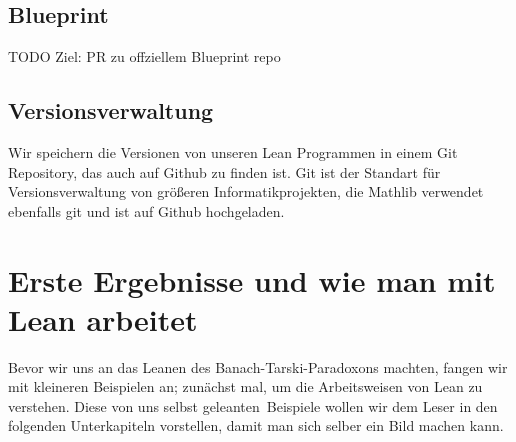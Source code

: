 \documentclass[10pt]{article}
\begin{document}
\subsection{Blueprint}




TODO Ziel: PR zu offziellem Blueprint repo

\subsection{Versionsverwaltung}
Wir speichern die Versionen von unseren Lean Programmen in einem Git Repository, das auch auf Github zu finden ist. Git ist der Standart für Versionsverwaltung von größeren Informatikprojekten, die Mathlib verwendet ebenfalls git und ist auf Github hochgeladen.

\section{Erste Ergebnisse und wie man mit Lean arbeitet}
Bevor wir uns an das Leanen des Banach-Tarski-Paradoxons machten, fangen wir mit kleineren Beispielen an; zunächst mal, um die Arbeitsweisen von Lean zu verstehen. Diese von uns selbst \glqq geleanten\grqq~Beispiele wollen wir dem Leser in den folgenden Unterkapiteln vorstellen, damit man sich selber ein Bild machen kann.  
\end{document}
